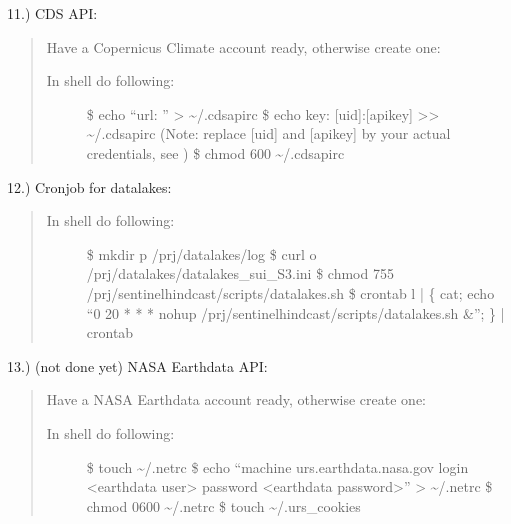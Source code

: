 \documentclass[letterpaper,10pt,english]{sphinxmanual}
\begin{document}
11.) CDS API: 
\begin{quote}

Have a Copernicus Climate account ready, otherwise create one: 
\begin{description}
\item[{In shell do following:}] \leavevmode
\$ echo “url: ” \textgreater{} \textasciitilde{}/.cdsapirc
\$ echo key: {[}uid{]}:{[}api\sphinxhyphen{}key{]} \textgreater{}\textgreater{} \textasciitilde{}/.cdsapirc (Note: replace {[}uid{]} and {[}api\sphinxhyphen{}key{]} by your actual credentials, see  )
\$ chmod 600 \textasciitilde{}/.cdsapirc

\end{description}
\end{quote}

12.) Cronjob for datalakes: 
\begin{quote}
\begin{description}
\item[{In shell do following:}] \leavevmode
\$ mkdir \sphinxhyphen{}p /prj/datalakes/log
\$ curl  \sphinxhyphen{}o /prj/datalakes/datalakes\_sui\_S3.ini
\$ chmod 755 /prj/sentinel\sphinxhyphen{}hindcast/scripts/datalakes.sh
\$ crontab \sphinxhyphen{}l | \{ cat; echo “0 20 * * * nohup /prj/sentinel\sphinxhyphen{}hindcast/scripts/datalakes.sh \&”; \} | crontab \sphinxhyphen{}

\end{description}
\end{quote}

13.) (not done yet) NASA Earthdata API: 
\begin{quote}

Have a NASA Earthdata account ready, otherwise create one: 
\begin{description}
\item[{In shell do following:}] \leavevmode
\$ touch \textasciitilde{}/.netrc
\$ echo “machine urs.earthdata.nasa.gov login \textless{}earthdata user\textgreater{} password \textless{}earthdata password\textgreater{}” \textgreater{} \textasciitilde{}/.netrc
\$ chmod 0600 \textasciitilde{}/.netrc
\$ touch \textasciitilde{}/.urs\_cookies

\end{description}
\end{quote}
\end{document}
